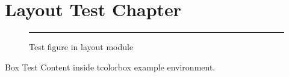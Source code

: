\documentclass[chapterprefix=true,numbers=noenddot]{scrbook}
\begin{document}

\chapter{Layout Test Chapter}

\begin{figure}[htbp]
  \centering
  \rule{2cm}{2cm}
  \caption{Test figure in layout module}
  \label{fig:layout-test}
\end{figure}

\begin{example}{Box Test}
Content inside tcolorbox example environment.
\end{example}
\end{document}
